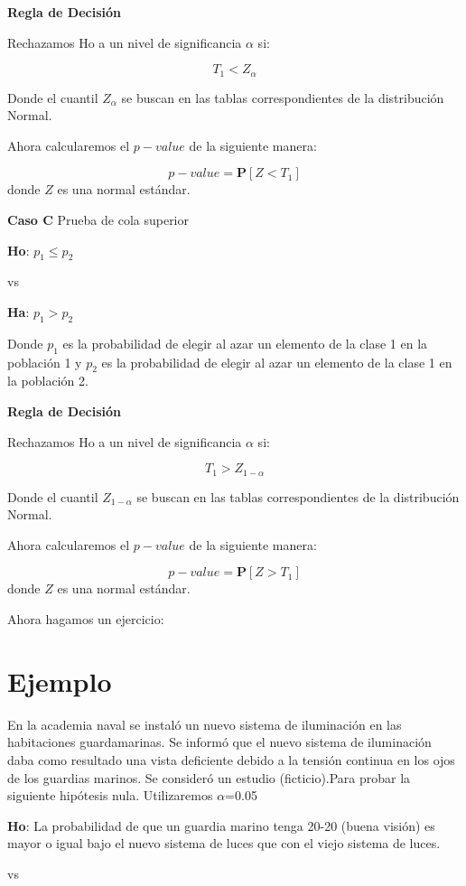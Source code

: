 \documentclass[a4paper,oneside,openany]{book}
\begin{document}
\textbf{Regla de Decisión}

Rechazamos Ho a un nivel de significancia \(\alpha\) si:

\[T_{1}< Z_{\alpha}\]

Donde el cuantil \(Z_{\alpha}\) se buscan en las tablas correspondientes
de la distribución Normal.

Ahora calcularemos el \(p-value\) de la siguiente manera:

\[p-value=\mathbf{P}[Z<T_{1}]\] donde \(Z\) es una normal estándar.

\textbf{Caso C} Prueba de cola superior

\textbf{Ho}: \(p_{1} \leq p_{2}\)

vs

\textbf{Ha}: \(p_{1} > p_{2}\)

Donde \(p_{1}\) es la probabilidad de elegir al azar un elemento de la
clase 1 en la población 1 y \(p_{2}\) es la probabilidad de elegir al
azar un elemento de la clase 1 en la población 2.

\textbf{Regla de Decisión}

Rechazamos Ho a un nivel de significancia \(\alpha\) si:

\[T_{1} > Z_{1-\alpha}\]

Donde el cuantil \(Z_{1-\alpha}\) se buscan en las tablas
correspondientes de la distribución Normal.

Ahora calcularemos el \(p-value\) de la siguiente manera:

\[p-value=\mathbf{P}[Z>T_{1}]\] donde \(Z\) es una normal estándar.

Ahora hagamos un ejercicio:

\section{Ejemplo}\label{ejemplo-9}

En la academia naval se instaló un nuevo sistema de iluminación en las
habitaciones guardamarinas. Se informó que el nuevo sistema de
iluminación daba como resultado una vista deficiente debido a la tensión
continua en los ojos de los guardias marinos. Se consideró un estudio
(ficticio).Para probar la siguiente hipótesis nula. Utilizaremos
\(\alpha\)=0.05

\textbf{Ho}: La probabilidad de que un guardia marino tenga 20-20 (buena
visión) es mayor o igual bajo el nuevo sistema de luces que con el viejo
sistema de luces.

vs
\end{document}
